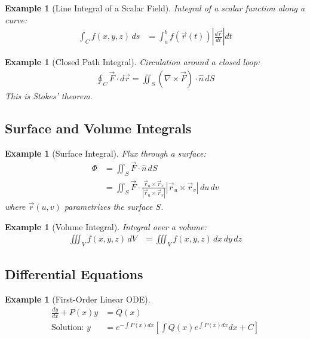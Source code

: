 \documentclass{article}
\newtheorem{example}[theorem]{Example}
\begin{document}
\begin{example}[Line Integral of a Scalar Field]
Integral of a scalar function along a curve:
\begin{align*}
    \int_C f(x,y,z) \, ds &= \int_a^b f(\vec{r}(t)) \left|\frac{d\vec{r}}{dt}\right| dt
\end{align*}
\end{example}

\begin{example}[Closed Path Integral]
Circulation around a closed loop:
\begin{align*}
    \oint_C \vec{F} \cdot d\vec{r} = \iint_S (\nabla \times \vec{F}) \cdot \hat{n} \, dS
\end{align*}
This is Stokes' theorem.
\end{example}

\subsection{Surface and Volume Integrals}

\begin{example}[Surface Integral]
Flux through a surface:
\begin{align*}
    \Phi &= \iint_S \vec{F} \cdot \hat{n} \, dS \\
    &= \iint_S \vec{F} \cdot \frac{\vec{r}_u \times \vec{r}_v}{|\vec{r}_u \times \vec{r}_v|} |\vec{r}_u \times \vec{r}_v| \, du \, dv
\end{align*}
where $\vec{r}(u,v)$ parametrizes the surface $S$.
\end{example}

\begin{example}[Volume Integral]
Integral over a volume:
\begin{align*}
    \iiint_V f(x,y,z) \, dV &= \iiint_V f(x,y,z) \, dx \, dy \, dz
\end{align*}
\end{example}

\subsection{Differential Equations}

\begin{example}[First-Order Linear ODE]
\begin{align*}
    \frac{dy}{dx} + P(x)y &= Q(x) \\
    \text{Solution: } y &= e^{-\int P(x)dx}\left[\int Q(x)e^{\int P(x)dx}dx + C\right]
\end{align*}
\end{example}
\end{document}
